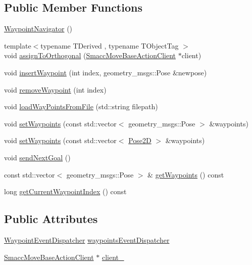 \subsection*{Public Member Functions}
\begin{DoxyCompactItemize}
\item 
\hyperlink{classsmacc_1_1WaypointNavigator_a8924fe11db589727a91048ffdba2a85f}{Waypoint\+Navigator} ()
\item 
{\footnotesize template$<$typename T\+Derived , typename T\+Object\+Tag $>$ }\\void \hyperlink{classsmacc_1_1WaypointNavigator_abf6fa4d0d15b75cc83864d99dcee4b5c}{assign\+To\+Orthogonal} (\hyperlink{classsmacc_1_1SmaccMoveBaseActionClient}{Smacc\+Move\+Base\+Action\+Client} $\ast$client)
\item 
void \hyperlink{classsmacc_1_1WaypointNavigator_abdcd86738247eccaf849903881247b0d}{insert\+Waypoint} (int index, geometry\+\_\+msgs\+::\+Pose \&newpose)
\item 
void \hyperlink{classsmacc_1_1WaypointNavigator_a4c290be90b5bfa44687f8beaa867f9b8}{remove\+Waypoint} (int index)
\item 
void \hyperlink{classsmacc_1_1WaypointNavigator_a3324ee12d697827e242b48ab3fd23edb}{load\+Way\+Points\+From\+File} (std\+::string filepath)
\item 
void \hyperlink{classsmacc_1_1WaypointNavigator_a2cb7fb208ade09ed7af4585837d051ee}{set\+Waypoints} (const std\+::vector$<$ geometry\+\_\+msgs\+::\+Pose $>$ \&waypoints)
\item 
void \hyperlink{classsmacc_1_1WaypointNavigator_a035fd5f71532fa87981a477fde5d363c}{set\+Waypoints} (const std\+::vector$<$ \hyperlink{structsmacc_1_1Pose2D}{Pose2D} $>$ \&waypoints)
\item 
void \hyperlink{classsmacc_1_1WaypointNavigator_a127438f90a00e98628ebd64b4c84b0b7}{send\+Next\+Goal} ()
\item 
const std\+::vector$<$ geometry\+\_\+msgs\+::\+Pose $>$ \& \hyperlink{classsmacc_1_1WaypointNavigator_afe1e18903d81f1d3eb20e2689f25b2ca}{get\+Waypoints} () const 
\item 
long \hyperlink{classsmacc_1_1WaypointNavigator_a6da63a864cb26b56922ca8c685e1a49c}{get\+Current\+Waypoint\+Index} () const 
\end{DoxyCompactItemize}
\subsection*{Public Attributes}
\begin{DoxyCompactItemize}
\item 
\hyperlink{classsmacc_1_1WaypointEventDispatcher}{Waypoint\+Event\+Dispatcher} \hyperlink{classsmacc_1_1WaypointNavigator_aab7ff616b0eba7a5ad5f03113f2de8fd}{waypoints\+Event\+Dispatcher}
\item 
\hyperlink{classsmacc_1_1SmaccMoveBaseActionClient}{Smacc\+Move\+Base\+Action\+Client} $\ast$ \hyperlink{classsmacc_1_1WaypointNavigator_a0eaab4d0459b0120b0a08b19e329a2c9}{client\+\_\+}
\end{DoxyCompactItemize}
